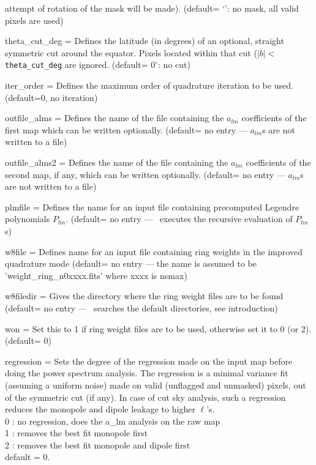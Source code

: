 \begin{qualifiers}
\begin{qulist}{}
attempt of rotation of the mask will be made).
(default= `': no mask, all valid pixels are used)
 \item[{theta\_cut\_deg = }] Defines the latitude (in degrees) of 
an optional, straight symmetric cut around the equator.  Pixels located within
that cut ($|b|<${\tt theta\_cut\_deg} are ignored.
(default= $0^\circ$: no cut)
 \item[{iter\_order = }] Defines the maximum order of quadrature 
iteration to be used. (default=0, no iteration)
 \item[{outfile\_alms = }] Defines the name of the file 
containing the $a_{lm}$  coefficients of the first map
which can be written optionally.   (default= no entry ---
$a_{lm}$s are not written to a file)
 \item[{outfile\_alms2 = }] Defines the name of the file 
containing the $a_{lm}$  coefficients of the second map, if any,
which can be written optionally.   (default= no entry ---
$a_{lm}$s are not written to a file)
 \item[{plmfile = }] Defines the name for an input file
    containing  precomputed Legendre polynomials $P_{lm}$.
(default= no entry --- \thedocid\ executes the recursive evaluation 
of $P_{lm}$s)
\item[{w8file = }] Defines name for an input file containing ring
  weights in the improved quadrature mode (default= no entry ---
the name is assumed to be 'weight\_ring\_n0xxxx.fits' where xxxx is nsmax)
\item[{w8filedir = }] Gives the directory where the ring weight files are
to be found (default= no entry --- \thedocid\ searches the default
directories, see introduction)
\item[{won = }] Set this to 1 if ring weight files are to be used,
otherwise set it to 0 (or 2). (default= 0)
\item[{regression = }] {{Sets the degree of the regression made on the
input map before doing the power spectrum analysis. 
The regression is a minimal variance fit (assuming a uniform noise) 
made on valid (unflagged and unmasked) pixels, out of the symmetric cut (if
any). In case of cut sky analysis, such a regression reduces the monopole
and dipole leakage to higher $\ell$'s.\\
0 : no regression, does the a\_lm analysis on the raw map\\
1 : removes the best fit monopole first\\
2 : removes the best fit monopole and dipole first\\
default = 0.}}
 
  \end{qulist}
\end{qualifiers}
\vfill

